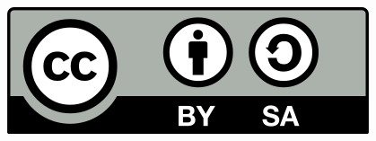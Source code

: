 
\cleardoublepage


\begin{figure}[h]
	\raggedleft
	\includegraphics[width=0.25\linewidth]{figs/by-sa.png}
	\label{fig:cc}
\end{figure}








